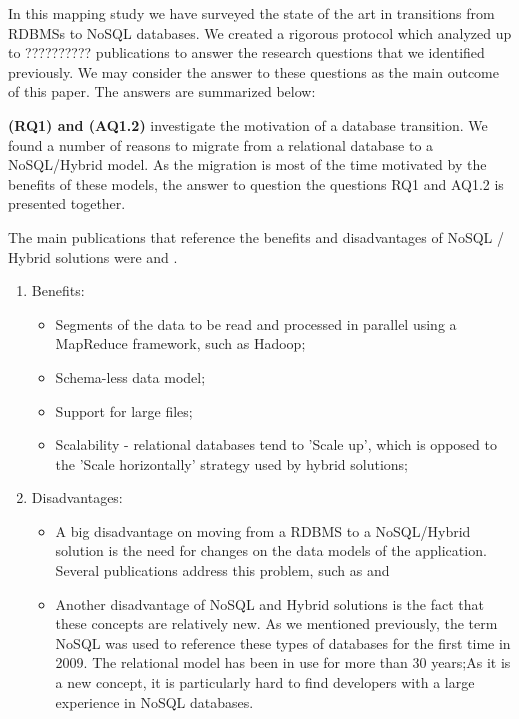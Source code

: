 \documentclass{article}
\begin{document}
\newpage


In this mapping study we have surveyed the state of the art in transitions from RDBMSs to NoSQL databases. We created a rigorous protocol which analyzed up to ?????????? publications to answer the research questions that we identified previously. We may consider the answer to these questions as the main outcome of this paper. The answers are summarized below:
\\

{\textbf{(RQ1) and (AQ1.2)} investigate the motivation of a database transition. We found a number of reasons to migrate from a relational database to a NoSQL/Hybrid model. As the migration is most of the time motivated by the benefits of these models, the answer to question the questions RQ1 and AQ1.2 is presented together. 

 The main publications that reference the benefits and disadvantages of NoSQL / Hybrid solutions  were \cite{Schram:2012:MND:2384716.2384773} \cite{buazuartransition} and \cite{gomez2014building}.

\begin{enumerate}
    \item Benefits: 
\begin{itemize}
  \item Segments of the data to be read and processed in parallel using a MapReduce framework, such as Hadoop;
  \item Schema-less data model;
  \item Support for large files;
  \item Scalability - relational databases tend to 'Scale up', which is opposed to the 'Scale horizontally' strategy used by hybrid solutions;
\end{itemize}

    \item Disadvantages:
    \begin{itemize}
    \item A big disadvantage on moving from a RDBMS to a NoSQL/Hybrid solution is the need for changes on the data models of the application. Several publications address this problem, such as \cite{Schram:2012:MND:2384716.2384773} \cite{Cattell:2011:SSN:1978915.1978919} and \cite{Mohan:2013:HRI:2452376.2452378}
    \item Another disadvantage of NoSQL and Hybrid solutions is the fact that these concepts are relatively new. As we mentioned previously, the term NoSQL was used to reference these types of databases for the first time in 2009\cite{ericevans}. The relational model has been in use for more than 30 years;As it is a new concept, it is particularly hard to find developers with a large experience in NoSQL databases.
\end{itemize}
    


\end{enumerate}}
\end{document}

